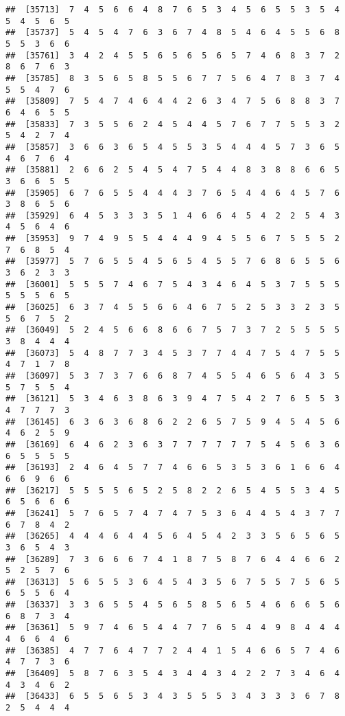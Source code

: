 \documentclass[
]{book}
\begin{document}
\begin{verbatim}
##  [35713]  7  4  5  6  6  4  8  7  6  5  3  4  5  6  5  5  3  5  4  5  4  5  6  5
##  [35737]  5  4  5  4  7  6  3  6  7  4  8  5  4  6  4  5  5  6  8  5  5  3  6  6
##  [35761]  3  4  2  4  5  5  6  5  6  5  6  5  7  4  6  8  3  7  2  8  6  7  6  3
##  [35785]  8  3  5  6  5  8  5  5  6  7  7  5  6  4  7  8  3  7  4  5  5  4  7  6
##  [35809]  7  5  4  7  4  6  4  4  2  6  3  4  7  5  6  8  8  3  7  6  4  6  5  5
##  [35833]  7  3  5  5  6  2  4  5  4  4  5  7  6  7  7  5  5  3  2  5  4  2  7  4
##  [35857]  3  6  6  3  6  5  4  5  5  3  5  4  4  4  5  7  3  6  5  4  6  7  6  4
##  [35881]  2  6  6  2  5  4  5  4  7  5  4  4  8  3  8  8  6  6  5  3  6  6  5  5
##  [35905]  6  7  6  5  5  4  4  4  3  7  6  5  4  4  6  4  5  7  6  3  8  6  5  6
##  [35929]  6  4  5  3  3  3  5  1  4  6  6  4  5  4  2  2  5  4  3  4  5  6  4  6
##  [35953]  9  7  4  9  5  5  4  4  4  9  4  5  5  6  7  5  5  5  2  7  6  8  5  4
##  [35977]  5  7  6  5  5  4  5  6  5  4  5  5  7  6  8  6  5  5  6  3  6  2  3  3
##  [36001]  5  5  5  7  4  6  7  5  4  3  4  6  4  5  3  7  5  5  5  5  5  5  6  5
##  [36025]  6  3  7  4  5  5  6  6  4  6  7  5  2  5  3  3  2  3  5  5  6  7  5  2
##  [36049]  5  2  4  5  6  6  8  6  6  7  5  7  3  7  2  5  5  5  5  3  8  4  4  4
##  [36073]  5  4  8  7  7  3  4  5  3  7  7  4  4  7  5  4  7  5  5  4  7  1  7  8
##  [36097]  5  3  7  3  7  6  6  8  7  4  5  5  4  6  5  6  4  3  5  5  7  5  5  4
##  [36121]  5  3  4  6  3  8  6  3  9  4  7  5  4  2  7  6  5  5  3  4  7  7  7  3
##  [36145]  6  3  6  3  6  8  6  2  2  6  5  7  5  9  4  5  4  5  6  4  6  2  5  9
##  [36169]  6  4  6  2  3  6  3  7  7  7  7  7  7  5  4  5  6  3  6  6  5  5  5  5
##  [36193]  2  4  6  4  5  7  7  4  6  6  5  3  5  3  6  1  6  6  4  6  6  9  6  6
##  [36217]  5  5  5  5  6  5  2  5  8  2  2  6  5  4  5  5  3  4  5  6  5  6  6  6
##  [36241]  5  7  6  5  7  4  7  4  7  5  3  6  4  4  5  4  3  7  7  6  7  8  4  2
##  [36265]  4  4  4  6  4  4  5  6  4  5  4  2  3  3  5  6  5  6  5  3  6  5  4  3
##  [36289]  7  3  6  6  6  7  4  1  8  7  5  8  7  6  4  4  6  6  2  5  2  5  7  6
##  [36313]  5  6  5  5  3  6  4  5  4  3  5  6  7  5  5  7  5  6  5  6  5  5  6  4
##  [36337]  3  3  6  5  5  4  5  6  5  8  5  6  5  4  6  6  6  5  6  6  8  7  3  4
##  [36361]  5  9  7  4  6  5  4  4  7  7  6  5  4  4  9  8  4  4  4  4  6  6  4  6
##  [36385]  4  7  7  6  4  7  7  2  4  4  1  5  4  6  6  5  7  4  6  4  7  7  3  6
##  [36409]  5  8  7  6  3  5  4  3  4  4  3  4  2  2  7  3  4  6  4  4  3  4  6  2
##  [36433]  6  5  5  6  5  3  4  3  5  5  5  3  4  3  3  3  6  7  8  2  5  4  4  4

\end{verbatim}
\end{document}

